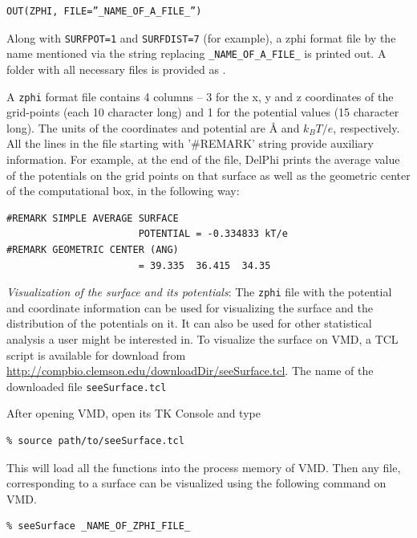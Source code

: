 \documentclass[9pt,tutorial]{livecoms}
\newcommand*\ttvar[1]{\texttt{\expandafter\dottvar\detokenize{#1}\relax}}
\newcommand*\dottvar[1]{\ifx\relax#1\else
  \expandafter\ifx\string_#1\string_\allowbreak\else#1\fi
  \expandafter\dottvar\fi}
\begin{document}
\begin{verbatim}
OUT(ZPHI, FILE=”_NAME_OF_A_FILE_”)
\end{verbatim}

Along with \texttt{SURFPOT=1} and \texttt{SURFDIST=7} (for example), a zphi format file by the name mentioned via the string replacing \texttt{\_NAME\_OF\_A\_FILE\_} is printed out. A folder with all necessary files is provided as \ttvar{Example_3.1.3/}. 

A \texttt{zphi} format file contains 4 columns – 3 for the x, y and z coordinates of the grid-points (each 10 character long) and 1 for the potential values (15 character long). The units of the coordinates and potential are Å and $ k_BT/e $, respectively. All the lines in the file starting with '\#REMARK' string provide auxiliary information. For example, at the end of the file, DelPhi prints the average value of the potentials on the grid points on that surface as well as the geometric center of the computational box, in the following way:

\begin{verbatim}
#REMARK SIMPLE AVERAGE SURFACE 
                       POTENTIAL = -0.334833 kT/e
#REMARK GEOMETRIC CENTER (ANG)          
                       = 39.335  36.415  34.35
\end{verbatim}

\textit{Visualization of the surface and its potentials}:
The \texttt{zphi} file with the potential and coordinate information can be used for visualizing the surface and the distribution of the potentials on it. It can also be used for other statistical analysis a user might be interested in. To visualize the surface on VMD\cite{humphrey1996vmd}, a TCL script is available for download from \url{http://compbio.clemson.edu/downloadDir/seeSurface.tcl}. The name of the downloaded file \texttt{seeSurface.tcl}

After opening VMD, open its TK Console and type

\begin{verbatim}
% source path/to/seeSurface.tcl
\end{verbatim}

This will load all the functions into the process memory of VMD\cite{humphrey1996vmd}. Then any file, corresponding to a surface can be visualized using the following command on VMD.

\begin{verbatim}
% seeSurface _NAME_OF_ZPHI_FILE_
\end{verbatim}
\end{document}

